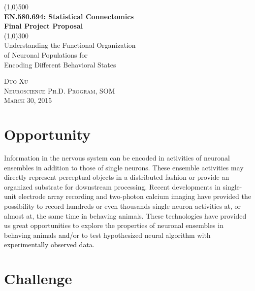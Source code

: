 \documentclass{article}
\begin{document}
\begin{titlepage}

	\begin{center}
		\line(1,0){500} \\
		[4mm]
		\huge{\bfseries EN.580.694: Statistical Connectomics \\
		Final Project Proposal} \\
		[1mm]
		\line(1,0){300} \\
		[1cm]
		\textsc{\LARGE } Understanding the Functional Organization \\
		of Neuronal Populations for \\
		Encoding Different Behavioral States\\
		[9cm]
	\end{center}
	\begin{flushright}
		\textsc
		{\large Duo Xu \\
		Neuroscience Ph.D. Program, SOM \\
		March 30, 2015 \\}
	\end{flushright}

\end{titlepage}


\section{Opportunity}

Information in the nervous system can be encoded in activities of neuronal ensembles in addition to those of single neurons. These ensemble activities may directly represent perceptual objects in a distributed fashion or provide an organized substrate for downstream processing. Recent developments in single-unit electrode array recording and two-photon calcium imaging have provided the possibility to record hundreds or even thousands single neuron activities at, or almost at, the same time in behaving animals. These technologies have provided us great opportunities to explore the properties of neuronal ensembles in behaving animals and/or to test hypothesized neural algorithm with experimentally observed data. 


\section{Challenge}
\end{document}
